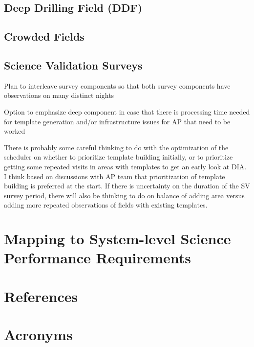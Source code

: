 \documentclass[SE,authoryear,toc]{lsstdoc}
\begin{document}


\subsection{Deep Drilling Field (DDF)}



\subsection{Crowded Fields}

%

\subsection{Science Validation Surveys}

Plan to interleave survey components so that both survey components have observations on many distinct nights

Option to emphasize deep component in case that there is processing time needed for template generation and/or infrastructure issues for AP that need to be worked

There is probably some careful thinking to do with the optimization of the scheduler on whether to prioritize template building initially, or to prioritize getting some repeated visits in areas with templates to get an early look at DIA. I think based on discussions with AP team that prioritization of template building is preferred at the start. If there is uncertainty on the duration of the SV survey period, there will also be thinking to do on balance of adding area versus adding more repeated observations of fields with existing templates.





\section{Mapping to System-level Science Performance Requirements}

\appendix
\section{References} \label{sec:bib}
\renewcommand{\refname}{} %


\section{Acronyms} \label{sec:acronyms}

\end{document}
